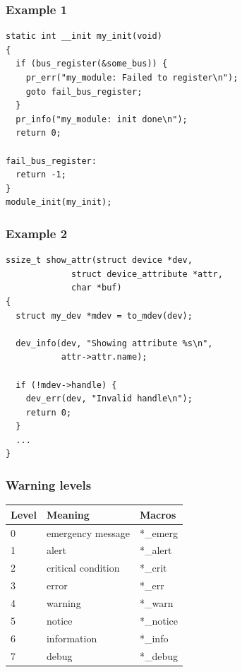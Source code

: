 \documentclass{beamer}
\begin{document}
\begin{frame}[fragile]
\frametitle{Example 1}
\begin{verbatim}
static int __init my_init(void)
{
  if (bus_register(&some_bus)) {
    pr_err("my_module: Failed to register\n");
    goto fail_bus_register;
  }
  pr_info("my_module: init done\n");
  return 0;

fail_bus_register:
  return -1;
}
module_init(my_init);
\end{verbatim}
\end{frame}

\begin{frame}[fragile]
\frametitle{Example 2}
\begin{verbatim}
ssize_t show_attr(struct device *dev,
             struct device_attribute *attr,
             char *buf)
{
  struct my_dev *mdev = to_mdev(dev);
  
  dev_info(dev, "Showing attribute %s\n",
           attr->attr.name);
  
  if (!mdev->handle) {
    dev_err(dev, "Invalid handle\n");
    return 0;
  }
  ...
}
\end{verbatim}
\end{frame}

\begin{frame}
\frametitle{Warning levels}

\begin{table}[h!]
  \begin{tabular}{l l l}
   \toprule
	Level & Meaning & Macros \\
   \midrule
	0 & emergency message & *\_emerg \\
	1 & alert & *\_alert \\
	2 & critical condition & *\_crit \\
	3 & error & *\_err \\
	4 & warning & *\_warn \\
	5 & notice & *\_notice \\
	6 & information & *\_info \\
	7 & debug & *\_debug \\
   \bottomrule
  \end{tabular}
\end{table}

\end{frame}
\end{document}
